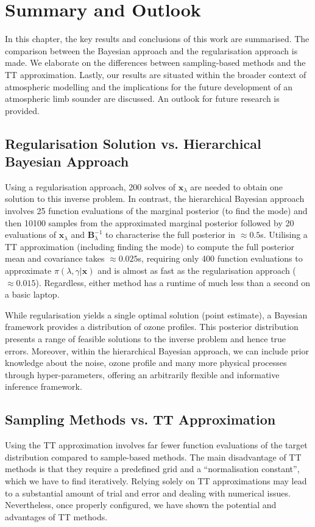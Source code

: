 \chapter{Summary and Outlook}
\label{ch:Concl}
\thispagestyle{empty}
In this chapter, the key results and conclusions of this work are summarised.
The comparison between the Bayesian approach and the regularisation approach is made.
We elaborate on the differences between sampling-based methods and the TT approximation.
Lastly, our results are situated within the broader context of atmospheric modelling and the implications for the future development of an atmospheric limb sounder are discussed.
An outlook for future research is provided.



\section{Regularisation Solution vs. Hierarchical Bayesian Approach}
Using a regularisation approach, 200 solves of $\bm{x}_{\lambda}$ are needed to obtain one solution to this inverse problem.
In contrast, the hierarchical Bayesian approach involves 25 function evaluations of the marginal posterior (to find the mode) and then 10100 samples from the approximated marginal posterior followed by 20 evaluations of $\bm{x}_{\lambda}$ and $\bm{B}^{-1}_{\lambda}$ to characterise the full posterior in $\approx 0.5$s.
Utilising a TT approximation (including finding the mode) to compute the full posterior mean and covariance takes $\approx 0.025$s, requiring only 400 function evaluations to approximate $\pi(\lambda, \gamma | \bm{x})$ and is almost as fast as the regularisation approach ($\approx 0.015$).
Regardless, either method has a runtime of much less than a second on a basic laptop.

While regularisation yields a single optimal solution (point estimate), a Bayesian framework provides a distribution of ozone profiles.
This posterior distribution presents a range of feasible solutions to the inverse problem and hence true errors.
Moreover, within the hierarchical Bayesian approach, we can include prior knowledge about the noise, ozone profile and many more physical processes through hyper-parameters, offering an arbitrarily flexible and informative inference framework.


\section{Sampling Methods vs. TT Approximation}
Using the TT approximation involves far fewer function evaluations of the target distribution compared to sample-based methods.
The main disadvantage of TT methods is that they require a predefined grid and a ``normalisation constant'', which we have to find iteratively.
Relying solely on TT approximations may lead to a substantial amount of trial and error and dealing with numerical issues.
Nevertheless, once properly configured, we have shown the potential and advantages of TT methods.

